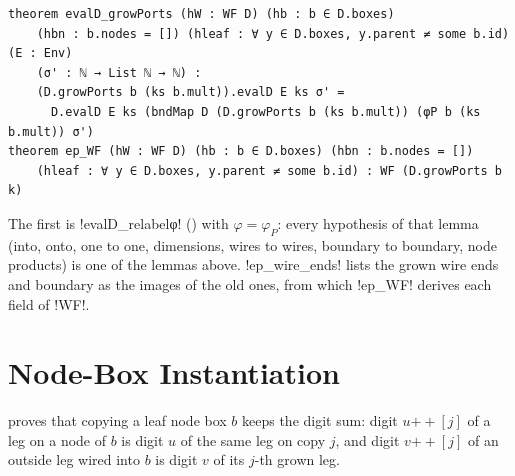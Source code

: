 {\begin{theorem}\label{thm:boxes-evalD-growPorts}
\begin{lstlisting}[style=leanbox]
theorem evalD_growPorts (hW : WF D) (hb : b ∈ D.boxes)
    (hbn : b.nodes = []) (hleaf : ∀ y ∈ D.boxes, y.parent ≠ some b.id) (E : Env)
    (σ' : ℕ → List ℕ → ℕ) :
    (D.growPorts b (ks b.mult)).evalD E ks σ' =
      D.evalD E ks (bndMap D (D.growPorts b (ks b.mult)) (φP b (ks b.mult)) σ')
theorem ep_WF (hW : WF D) (hb : b ∈ D.boxes) (hbn : b.nodes = [])
    (hleaf : ∀ y ∈ D.boxes, y.parent ≠ some b.id) : WF (D.growPorts b k)
\end{lstlisting}
\end{theorem}
\noindent The first is \lbx!evalD_relabelφ! () with $\varphi=\varphi_P$: every hypothesis of that lemma (into, onto, one to one, dimensions, wires to wires, boundary to boundary, node products) is one of the lemmas above. \lbx!ep_wire_ends! lists the grown wire ends and boundary as the images of the old ones, from which \lbx!ep_WF! derives each field of \lbx!WF!.

\section{Node-Box Instantiation}\label{sec:boxes-nodebox}

 proves that copying a leaf node box $b$ keeps the digit sum: digit $u\mathbin{+\!\!+}[j]$ of a leg on a node of $b$ is digit $u$ of the same leg on copy $j$, and digit $v\mathbin{+\!\!+}[j]$ of an outside leg wired into $b$ is digit $v$ of its $j$-th grown leg.

}
